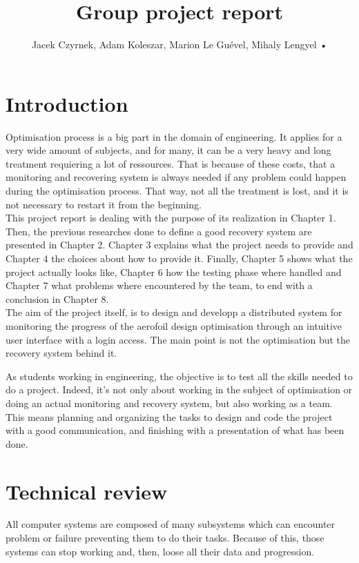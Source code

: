 \documentclass[10pt,a4paper]{report}
\author{Jacek Czyrnek, Adam Koleszar, Marion Le Guével, Mihaly Lengyel
•
}
\title{Group project report}
\begin{document}
\maketitle
\tableofcontents

\chapter{Introduction}
Optimisation process is a big part in the domain of engineering. It applies for a very wide amount of subjects, and for many, it can be a very heavy and long treatment requiering a lot of ressources. That is because of these costs, that a monitoring and recovering system is always needed if any problem could happen during the optimisation process. That way, not all the treatment is lost, and it is not necessary to restart it from the beginning.\\

This project report is dealing with the purpose of its realization in Chapter 1. Then, the previous researches done to define a good recovery system are presented in Chapter 2. Chapter 3 explains what the project needs to provide and Chapter 4 the choices about how to provide it. Finally, Chapter 5 shows what the project actually looks like, Chapter 6 how the testing phase where handled and Chapter 7 what problems where encountered by the team, to end with a conclusion in Chapter 8.\\

The aim of the project itself, is to design and developp a distributed system for monitoring the progress of the aerofoil design optimisation through an intuitive user interface with a login access. The main point is not the optimisation but the recovery system behind it.

As students working in engineering, the objective is to test all the skills needed to do a project. Indeed, it's not only about working in the subject of optimisation or doing an actual monitoring and recovery system, but also working as a team. This means planning and organizing the tasks to design and code the project with a good communication, and finishing with a presentation of what has been done.

\chapter{Technical review}
All computer systems are composed of many subsystems which can encounter problem or failure preventing them to do their tasks. Because of this, those systems can stop working and, then, loose all their data and progression.
\end{document}

